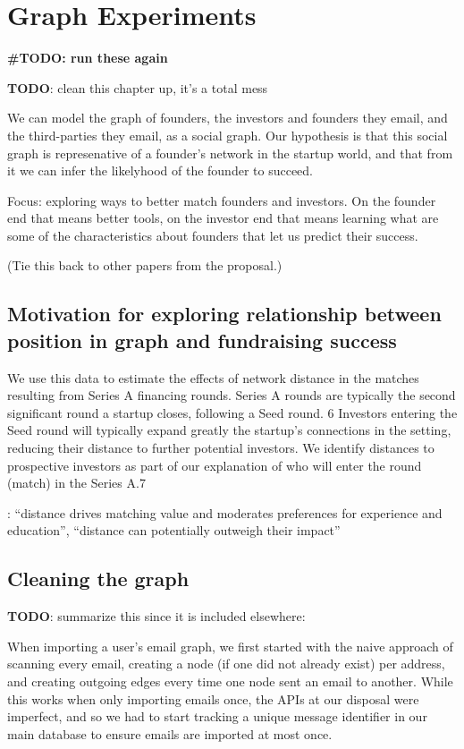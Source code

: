 \chapter{Graph Experiments}

\textbf{\#TODO: run these again}

\textbf{TODO}: clean this chapter up, it's a total mess

We can model the graph of founders, the investors and founders they email, and the third-parties they email, as a social graph. Our hypothesis is that this social graph is represenative of a founder's network in the startup world, and that from it we can infer the likelyhood of the founder to succeed.

Focus: exploring ways to better match founders and investors. On the founder end that means better tools, on the investor end that means learning what are some of the characteristics about founders that let us predict their success.

(Tie this back to other papers from the proposal.)

\section{Motivation for exploring relationship between position in graph and fundraising success}

We use this data to estimate the effects of network distance in the matches resulting from
Series A financing rounds. Series A rounds are typically the second significant round a startup
closes, following a Seed round.
6 Investors entering the Seed round will typically expand greatly
the startup’s connections in the setting, reducing their distance to further potential investors. We
identify distances to prospective investors as part of our explanation of who will enter the round
(match) in the Series A.7 \cite{pasquini2017matching}

\cite{pasquini2017matching}: ``distance drives matching value and moderates preferences for experience and education'', ``distance can potentially outweigh their impact''

\section{Cleaning the graph}

\textbf{TODO}: summarize this since it is included elsewhere:

When importing a user's email graph, we first started with the naive approach of scanning every email, creating a node (if one did not already exist) per address, and creating outgoing edges every time one node sent an email to another. While this works when only importing emails once, the APIs at our disposal were imperfect, and so we had to start tracking a unique message identifier in our main database to ensure emails are imported at most once.

